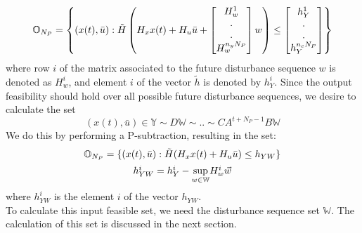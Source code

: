 \documentclass[letterpaper, 10 pt, conference]{ieeeconf}  %
\begin{document}
  \begin{equation}
  \small
  \mathbb{O}_{N_P}= \begin{Bmatrix}
  (x(t),\bar{u}):
  \tilde{H}
  \begin{pmatrix}
	H_xx(t) +
  H_u\bar{u} +  
  \begin{bmatrix}
  H^1_w \\ . \\ . \\ H^{n_yN_P}_w
  \end{bmatrix}
  w
  \end{pmatrix}
  \leq
  \begin{bmatrix}
  h_Y^1 \\ . \\ . \\ h_Y^{n_cN_P}
  \end{bmatrix}
  \end{Bmatrix}
  \end{equation}
  where row $i$ of the matrix associated to the future disturbance sequence $w$ is denoted as $H^i_w$, and element $i$ of the vector $\tilde{h}$ is denoted by $h_Y^i$.
  Since the output feasibility should hold over all possible future disturbance sequences, we desire to calculate the set
  \begin{equation}
   (x(t),\bar{u}) \in \mathbb{Y} \sim D\mathbb{W} \sim .. \sim CA^{t+N_P-1}B\mathbb{W} 
  \end{equation}
  We do this by performing a P-subtraction, resulting in the set:
  \begin{equation}
  \begin{matrix}
  \mathbb{O}_{N_P} = \{ (x(t),\bar{u}):\tilde{H}(H_xx(t)+H_u\bar{u})\leq h_{YW} \} \vspace{5pt} \\ 
  h_{YW}^i = h_Y^i-\underset{w\in \mathbb{W}}{\text{sup}} H_w^i \vec{w}
  \end{matrix}
  \label{overall}
  \end{equation}
  where $h_{YW}^i$ is the element $i$ of the vector $h_{YW}$.
  \\
  To calculate this input feasible set, we need the disturbance sequence set $\mathbb{W}$. The calculation of this set is discussed in the next section.
\end{document}
